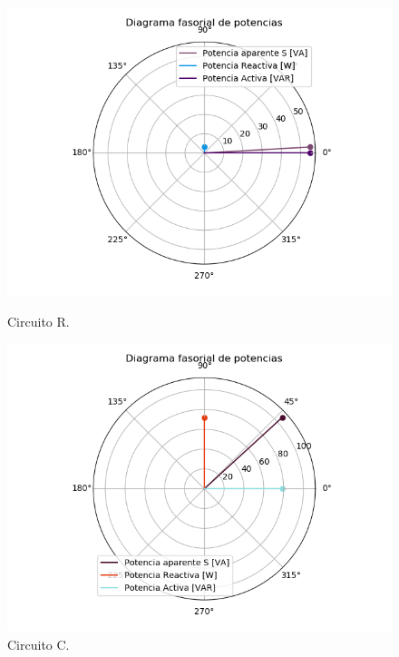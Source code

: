 \documentclass[a4paper]{article}
\begin{document}
\begin{figure}[H]
\centering
\begin{minipage}{.5\textwidth}
  \centering
  \includegraphics[width=1.2\linewidth]{Diag-Fas-2A}
  \caption{Circuito R.}
\end{minipage}%
\begin{minipage}{.5\textwidth}
  \centering
  \includegraphics[width=1.2\linewidth]{Diag-Fas-2B}
  \caption{Circuito C.}


\end{minipage}
\end{figure}
\end{document}

